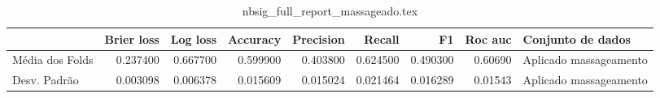 \begin{table}
\centering
\caption{nbsig_full_report_massageado.tex}
\label{nbsig_full_report_massageado.tex}
\begin{tabular}{lrrrrrrrl}
\toprule
{} &  Brier  loss &  Log loss &  Accuracy  &  Precision  &   Recall  &       F1  &  Roc auc  &       Conjunto de dados \\
\midrule
Média dos Folds &     0.237400 &  0.667700 &   0.599900 &    0.403800 &  0.624500 &  0.490300 &   0.60690 &  Aplicado massageamento \\
Desv. Padrão    &     0.003098 &  0.006378 &   0.015609 &    0.015024 &  0.021464 &  0.016289 &   0.01543 &  Aplicado massageamento \\
\bottomrule
\end{tabular}
\end{table}
